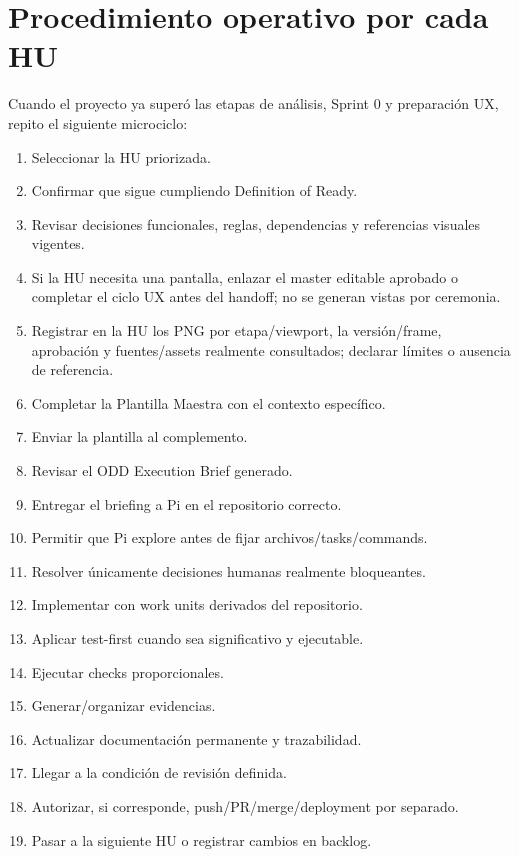 \documentclass[11pt,a4paper]{article}
\begin{document}
\section{Procedimiento operativo por cada HU}

Cuando el proyecto ya superó las etapas de análisis, Sprint 0 y preparación UX, repito el siguiente microciclo:

\begin{enumerate}
    \item Seleccionar la HU priorizada.
    \item Confirmar que sigue cumpliendo Definition of Ready.
    \item Revisar decisiones funcionales, reglas, dependencias y referencias visuales vigentes.
    \item Si la HU necesita una pantalla, enlazar el master editable aprobado o completar el ciclo UX antes del handoff; no se generan vistas por ceremonia.
    \item Registrar en la HU los PNG por etapa/viewport, la versión/frame, aprobación y fuentes/assets realmente consultados; declarar límites o ausencia de referencia.
    \item Completar la Plantilla Maestra con el contexto específico.
    \item Enviar la plantilla al complemento.
    \item Revisar el ODD Execution Brief generado.
    \item Entregar el briefing a Pi en el repositorio correcto.
    \item Permitir que Pi explore antes de fijar archivos/tasks/commands.
    \item Resolver únicamente decisiones humanas realmente bloqueantes.
    \item Implementar con work units derivados del repositorio.
    \item Aplicar test-first cuando sea significativo y ejecutable.
    \item Ejecutar checks proporcionales.
    \item Generar/organizar evidencias.
    \item Actualizar documentación permanente y trazabilidad.
    \item Llegar a la condición de revisión definida.
    \item Autorizar, si corresponde, push/PR/merge/deployment por separado.
    \item Pasar a la siguiente HU o registrar cambios en backlog.
\end{enumerate}
\end{document}
